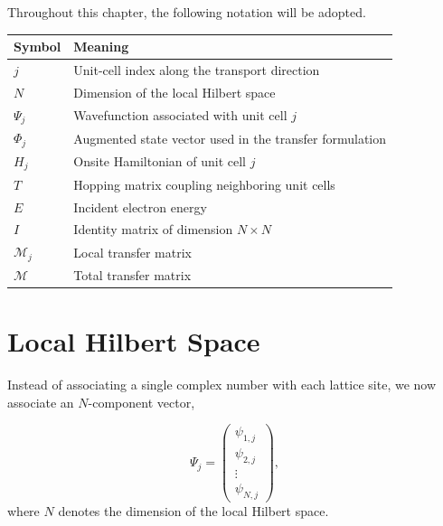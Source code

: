 Throughout this chapter, the following notation will be adopted.

\begin{center}
	\renewcommand{\arraystretch}{1.3}
	\begin{tabular}{ll}
		\hline
		Symbol          & Meaning                                                 \\
		\hline
		$j$             & Unit-cell index along the transport direction           \\
		$N$             & Dimension of the local Hilbert space                    \\
		$\Psi_j$        & Wavefunction associated with unit cell $j$              \\
		$\Phi_j$        & Augmented state vector used in the transfer formulation \\
		$H_j$           & Onsite Hamiltonian of unit cell $j$                     \\
		$T$             & Hopping matrix coupling neighboring unit cells          \\
		$E$             & Incident electron energy                                \\
		$I$             & Identity matrix of dimension $N\times N$                \\
		$\mathcal{M}_j$ & Local transfer matrix                                   \\
		$\mathcal{M}$   & Total transfer matrix                                   \\
		\hline
	\end{tabular}
\end{center}

\section{Local Hilbert Space}

Instead of associating a single complex number with each lattice site,
we now associate an $N$-component vector,

\begin{equation}
	\Psi_j
	=
	\begin{pmatrix}
		\psi_{1,j} \\
		\psi_{2,j} \\
		\vdots     \\
		\psi_{N,j}
	\end{pmatrix},
	\label{eq:vector-wavefunction}
\end{equation}
where $N$ denotes the dimension of the local Hilbert space.

